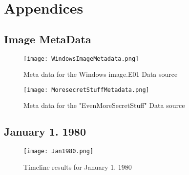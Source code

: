 \documentclass[
	letterpaper, %
	10pt, %
	unnumberedsections, %
	twoside, %
]{APAAssignment}
\begin{document}
\chapter{Appendices}
\begin{appendices}

	\section{Image MetaData}\label{app:MetaData}


	\begin{figure}[!h] %
		\centering
		\texttt{[image: WindowsImageMetadata.png]}
		\caption{Meta data for the Windows image.E01 Data source}
		\label{fig:windowsIageMetadata}
	\end{figure}


	\begin{figure}[!h] %
		\centering
		\texttt{[image: MoresecretStuffMetadata.png]}
		\caption{Meta data for the "EvenMoreSecretStuff" Data source}
		\label{fig:evenMoreSecretStuffMetaData}
	\end{figure}
	\clearpage
	\section{January 1. 1980}\label{app:Jan1980}


	\begin{figure}[!h] %
		\centering
		\texttt{[image: Jan1980.png]}
		\caption{Timeline results for January 1. 1980}
		\label{fig:Jan1980}
	\end{figure}



\end{appendices}
\end{document}
